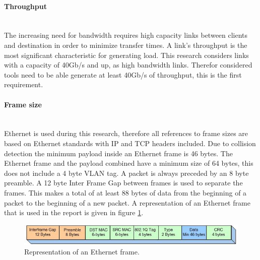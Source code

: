 \paragraph{Throughput}\label{par:throughput}\mbox{}\\
The increasing need for bandwidth requires high capacity links between clients and destination in order to minimize transfer times.
A link's throughput is the most significant characteristic for generating load. 
This research considers links with a capacity of 40Gb/s and up, as high bandwidth links.
Therefor considered tools need to be able generate at least 40Gb/s of throughput, this is the first requirement.  


\paragraph{Frame size}\label{par:framesize}\mbox{}\\
Ethernet is used during this research, therefore all references to frame sizes are based on Ethernet standards\cite{ethernet_frame_2017} with IP and TCP headers included.
Due to collision detection the minimum payload inside an Ethernet frame is 46 bytes.
The Ethernet frame and the payload combined have a minimum size of 64 bytes, this does not include a 4 byte VLAN tag. 
A packet is always preceded by an 8 byte preamble.
A 12 byte Inter Frame Gap between frames is used to separate the frames. 
This makes a total of at least 88 bytes of data from the beginning of a packet to the beginning of a new packet. 
A representation of an Ethernet frame that is used in the report is given in figure \ref{fig:juniperethernetframe}. 

\begin{figure}[H]
  \includegraphics[scale=1]{images/ethernetframe.jpg}
  \caption{Representation of an Ethernet frame.}
  \label{fig:juniperethernetframe}
\end{figure}

